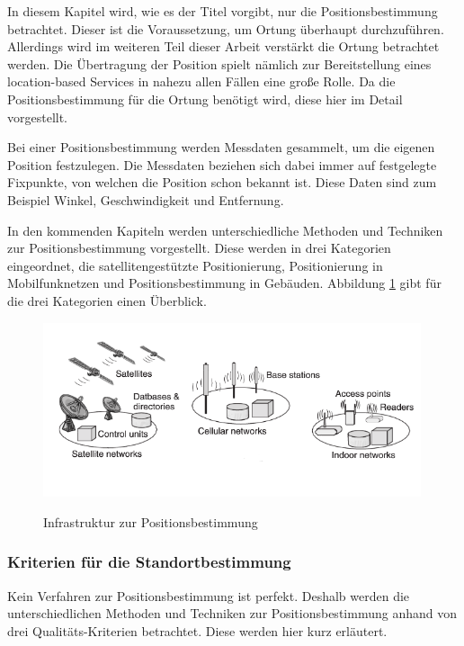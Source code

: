 In diesem Kapitel wird, wie es der Titel vorgibt, nur die Positionsbestimmung betrachtet. Dieser ist die Voraussetzung, um Ortung
überhaupt durchzuführen. Allerdings wird im weiteren Teil dieser Arbeit verstärkt die Ortung betrachtet werden. Die Übertragung der Position spielt nämlich zur Bereitstellung eines location-based Services in nahezu allen Fällen eine große Rolle. Da die Positionsbestimmung für die Ortung benötigt wird, diese hier im Detail vorgestellt. 


Bei einer Positionsbestimmung werden Messdaten gesammelt, um die eigenen Position festzulegen. Die Messdaten beziehen sich dabei immer auf festgelegte Fixpunkte, von welchen die Position schon bekannt ist.  Diese Daten sind zum Beispiel Winkel, Geschwindigkeit und Entfernung.

In den kommenden Kapiteln werden unterschiedliche Methoden und Techniken zur Positionsbestimmung vorgestellt. Diese werden in drei Kategorien eingeordnet, die satellitengestützte Positionierung, Positionierung in Mobilfunknetzen und Positionsbestimmung in Gebäuden.
Abbildung \ref{fig:Positionsbestimmung} gibt für die drei Kategorien einen Überblick.

\begin{figure}[h]
\centering
\includegraphics[width=0.99\textwidth]{ref/images/Positionsbestimmung.PNG}
\caption[Infrastruktur zur Positionsbestimmung]{Infrastruktur zur Positionsbestimmung}
\label{fig:Positionsbestimmung}
\cite[S. 124]{Kuepper2005}
\end{figure}

\subsubsection{Kriterien für die Standortbestimmung}

Kein Verfahren zur Positionsbestimmung ist perfekt. 
Deshalb werden die unterschiedlichen Methoden und Techniken zur Positionsbestimmung anhand von drei Qualitäts-Kriterien betrachtet. Diese werden hier kurz erläutert.

